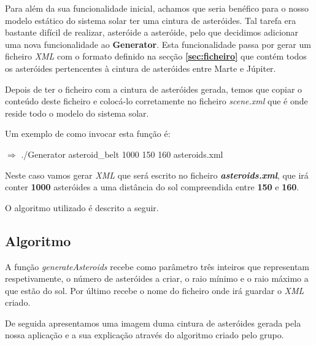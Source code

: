 \documentclass[a4paper]{article}
\begin{document}
Para além da sua funcionalidade inicial, achamos que seria benéfico para o nosso modelo estático do sistema solar ter uma cintura de asteróides. Tal tarefa era bastante difícil de realizar, asteróide a asteróide, pelo que decidimos adicionar uma nova funcionalidade ao \textbf{Generator}. Esta funcionalidade passa por gerar um ficheiro \emph{XML} com o formato definido na secção \textbf{\ref{sec:ficheiro}} que contém todos os asteróides pertencentes à cintura de asteróides entre Marte e Júpiter.

Depois de ter o ficheiro com a cintura de asteróides gerada, temos que copiar o conteúdo deste ficheiro e colocá-lo corretamente no ficheiro \emph{scene.xml} que é onde reside todo o modelo do sistema solar.

Um exemplo de como invocar esta função é:

 \vspace{0.5cm}
 
$\Rightarrow$ ./Generator asteroid\_belt 1000 150 160 asteroids.xml

 \vspace{0.5cm}
 
 Neste caso vamos gerar \emph{XML} que será escrito no ficheiro \textbf{\emph{asteroids.xml}}, que irá conter \textbf{1000} asteróides a uma distância do sol compreendida entre \textbf{150} e \textbf{160}.

O algoritmo utilizado é descrito a seguir.

\subsection{Algoritmo}
A função \textit{generateAsteroids} recebe como parâmetro três inteiros que representam respetivamente, o número de asteróides a criar, o raio mínimo e o raio máximo a que estão do sol. Por último recebe o nome do ficheiro onde irá guardar o \emph{XML} criado.

De seguida apresentamos uma imagem duma cintura de asteróides gerada pela nossa aplicação e a sua explicação através do algoritmo criado pelo grupo.
\end{document}
